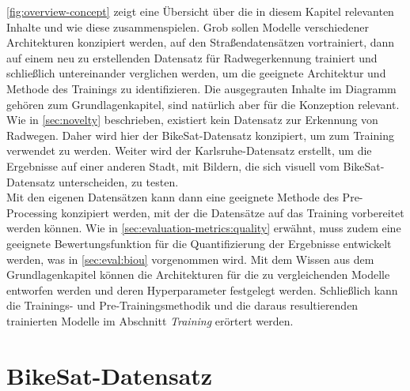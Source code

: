 \autoref{fig:overview-concept} zeigt eine Übersicht über die in diesem Kapitel relevanten Inhalte und wie diese 
zusammenspielen. Grob sollen Modelle verschiedener Architekturen 
konzipiert werden, auf den Straßendatensätzen vortrainiert, dann auf einem neu zu erstellenden Datensatz für Radwegerkennung 
trainiert und schließlich untereinander verglichen werden, um die geeignete Architektur und Methode des Trainings zu identifizieren. 
Die ausgegrauten Inhalte im Diagramm gehören zum Grundlagenkapitel, sind natürlich aber für die Konzeption relevant. \\ 
Wie in \autoref{sec:novelty} beschrieben, existiert kein Datensatz zur Erkennung von Radwegen. Daher wird hier 
der BikeSat-Datensatz konzipiert, um zum Training verwendet zu werden. Weiter wird der Karlsruhe-Datensatz 
erstellt, um die Ergebnisse auf einer anderen Stadt, mit Bildern, die sich visuell vom BikeSat-Datensatz unterscheiden, zu testen. \\
Mit den eigenen Datensätzen kann dann eine geeignete Methode des Pre-Processing konzipiert werden, mit der die Datensätze 
auf das Training vorbereitet werden können. Wie in \autoref{sec:evaluation-metrics:quality} erwähnt, muss zudem 
eine geeignete Bewertungsfunktion für die Quantifizierung der Ergebnisse entwickelt werden, was in \autoref{sec:eval:biou} 
vorgenommen wird. Mit dem Wissen aus dem Grundlagenkapitel können die Architekturen für die zu vergleichenden Modelle entworfen werden 
und deren Hyperparameter festgelegt werden. Schließlich kann die Trainings- und Pre-Trainingsmethodik und die daraus resultierenden 
trainierten Modelle im Abschnitt \textit{Training} erörtert werden.  

\section{BikeSat-Datensatz} \label{sec:bike-data}

